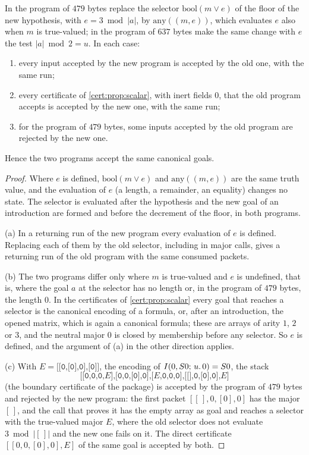 \begin{proposition}\label{cert:prop:eager-selector}
In the program of $479$ bytes replace the selector $\mathrm{bool}(m\lor e)$ of
the floor of the new hypothesis, with $e=3\bmod\lvert a\rvert$, by
$\mathrm{any}((m,e))$, which evaluates $e$ also when $m$ is true-valued; in the
program of $637$ bytes make the same change with $e$ the test
$\lvert a\rvert\bmod 2=u$. In each case:
\begin{enumerate}[label=(\alph*)]
\item every input accepted by the new program is accepted by the old one, with
the same run;
\item every certificate of \cref{cert:prop:scalar}, with inert fields $0$, that
the old program accepts is accepted by the new one, with the same run;
\item for the program of $479$ bytes, some inputs accepted by the old program
are rejected by the new one.
\end{enumerate}
Hence the two programs accept the same canonical goals.
\end{proposition}
\begin{proof}
Where $e$ is defined, $\mathrm{bool}(m\lor e)$ and $\mathrm{any}((m,e))$ are
the same truth value, and the evaluation of $e$ (a length, a remainder, an
equality) changes no state. The selector is evaluated after the hypothesis and
the new goal of an introduction are formed and before the decrement of the
floor, in both programs.

(a) In a returning run of the new program every evaluation of $e$ is defined.
Replacing each of them by the old selector, including in major calls, gives a
returning run of the old program with the same consumed packets.

(b) The two programs differ only where $m$ is true-valued and $e$ is undefined,
that is, where the goal $a$ at the selector has no length or, in the program
of $479$ bytes, the length $0$.
In the certificates of \cref{cert:prop:scalar} every goal that reaches a
selector is the canonical encoding of a formula, or, after an introduction,
the opened matrix, which is again a canonical formula; these are arrays of
arity $1$, $2$ or $3$, and the neutral major $0$ is closed by membership before
any selector. So $e$ is defined, and the argument of (a) in the other direction
applies.

(c) With $E=\texttt{[[0,[0],0],[0]]}$, the encoding of
$I(0,S 0;\,u.\,0)=S 0$, the stack
\[
\texttt{[[0,0,0,}E\texttt{],[0,0,[0],0],[}E\texttt{,0,0,0],[[],0,[0],0],}E\texttt{]}
\]
(the boundary certificate of the package) is accepted by the program of $479$
bytes and rejected by the new program: the first packet $[[\,],0,[0],0]$ has
the major $[\,]$, and the call that proves it has the empty array as goal and
reaches a selector with the true-valued major $E$, where the old selector does
not evaluate $3\bmod\lvert[\,]\rvert$ and the new one fails on it. The direct certificate $[[0,0,[0],0],E]$ of the same goal
is accepted by both.
\end{proof}


